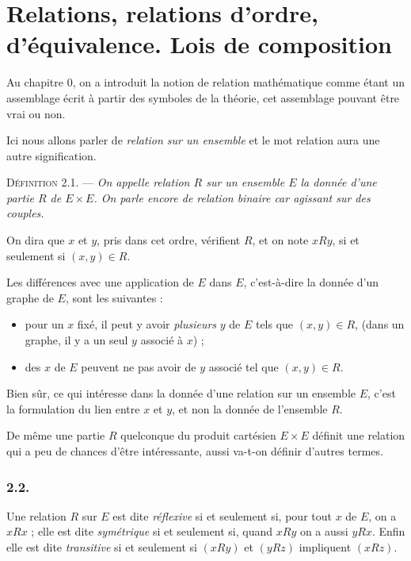 \chapter{Relations, relations d'ordre, d'équivalence. Lois de composition}

Au chapitre 0, on a introduit la notion de relation mathématique comme étant un assemblage écrit à partir des symboles de la théorie, cet assemblage pouvant être vrai ou non.

Ici nous allons parler de \emph{relation sur un ensemble} et le mot relation aura une autre signification.


\medskip\noindent\textsc{Définition 2.1.} --- \emph{On appelle relation $R$ sur un ensemble $E$ la donnée d'une partie $R$ de $E\times E$. On parle encore de relation binaire car agissant sur des couples.}

On dira que $x$ et $y$, pris dans cet ordre, vérifient $R$, et on note $xRy$, si et seulement si $(x,y)\in R$.

Les différences avec une application de $E$ dans $E$, c'est-à-dire la donnée d'un graphe de $E$, sont les suivantes :
\begin{itemize}[leftmargin=2em]
\item pour un $x$ fixé, il peut y avoir \emph{plusieurs} $y$ de $E$ tels que $(x,y)\in R$, (dans un graphe, il y a un seul $y$ associé à $x$) ;
\item des $x$ de $E$ peuvent ne pas avoir de $y$ associé tel que $(x,y)\in R$.
\end{itemize}

Bien sûr, ce qui intéresse dans la donnée d'une relation sur un ensemble $E$, c'est la formulation du lien entre $x$ et $y$, et non la donnée de l'ensemble $R$.

De même une partie $R$ quelconque du produit cartésien $E\times E$ définit une relation qui a peu de chances d'être intéressante, aussi va-t-on définir d'autres termes.

\subsection*{2.2.}
Une relation $R$ sur $E$ est dite \emph{réflexive} si et seulement si, pour tout $x$ de $E$, on a $xRx$ ; elle est dite \emph{symétrique} si et seulement si, quand $xRy$ on a aussi $yRx$. Enfin elle est dite \emph{transitive} si et seulement si $(xRy)$ et $(yRz)$ impliquent $(xRz)$.

